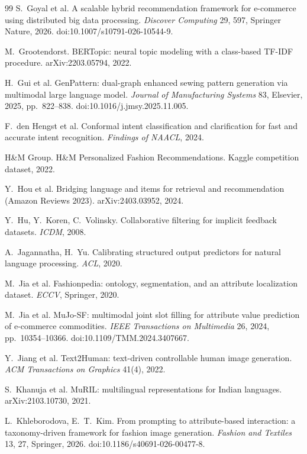 \begin{thebibliography}{99}
 S.~Goyal et al. A scalable hybrid recommendation framework for e-commerce using distributed big data processing. \emph{Discover Computing} 29, 597, Springer Nature, 2026. doi:10.1007/s10791-026-10544-9.

 M.~Grootendorst. BERTopic: neural topic modeling with a class-based TF-IDF procedure. arXiv:2203.05794, 2022.

 H.~Gui et al. GenPattern: dual-graph enhanced sewing pattern generation via multimodal large language model. \emph{Journal of Manufacturing Systems} 83, Elsevier, 2025, pp.~822--838. doi:10.1016/j.jmsy.2025.11.005.

 F.~den Hengst et al. Conformal intent classification and clarification for fast and accurate intent recognition. \emph{Findings of NAACL}, 2024.

 H\&M Group. H\&M Personalized Fashion Recommendations. Kaggle competition dataset, 2022.

 Y.~Hou et al. Bridging language and items for retrieval and recommendation (Amazon Reviews 2023). arXiv:2403.03952, 2024.

 Y.~Hu, Y.~Koren, C.~Volinsky. Collaborative filtering for implicit feedback datasets. \emph{ICDM}, 2008.

 A.~Jagannatha, H.~Yu. Calibrating structured output predictors for natural language processing. \emph{ACL}, 2020.

 M.~Jia et al. Fashionpedia: ontology, segmentation, and an attribute localization dataset. \emph{ECCV}, Springer, 2020.

 M.~Jia et al. MuJo-SF: multimodal joint slot filling for attribute value prediction of e-commerce commodities. \emph{IEEE Transactions on Multimedia} 26, 2024, pp.~10354--10366. doi:10.1109/TMM.2024.3407667.

 Y.~Jiang et al. Text2Human: text-driven controllable human image generation. \emph{ACM Transactions on Graphics} 41(4), 2022.

 S.~Khanuja et al. MuRIL: multilingual representations for Indian languages. arXiv:2103.10730, 2021.

 L.~Khleborodova, E.~T.~Kim. From prompting to attribute-based interaction: a taxonomy-driven framework for fashion image generation. \emph{Fashion and Textiles} 13, 27, Springer, 2026. doi:10.1186/s40691-026-00477-8.


\end{thebibliography}
